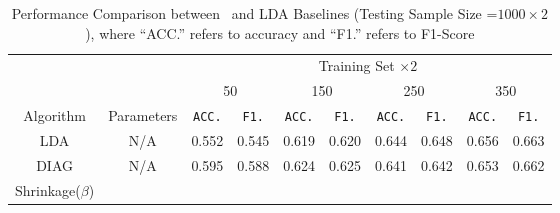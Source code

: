 \begin{table*}
{
\begin{center}
\caption{Performance Comparison between \TheName\ and LDA Baselines  (Testing Sample Size =$1000\times 2$), where ``ACC.'' refers to accuracy and ``F1.'' refers to F1-Score}
		\label{tab:table12}
\begin{tabular}{*{10}{c}}
\toprule
    & & \multicolumn{8}{c}{Training Set $\times 2$}\\
    \cmidrule(lr){3-10}
    & & 
    \multicolumn{2}{c}{50} &
    \multicolumn{2}{c}{150} &
    \multicolumn{2}{c}{250} &
    \multicolumn{2}{c}{350} \\
\cmidrule(lr){3-4}
\cmidrule(lr){5-6}
\cmidrule(lr){7-8}
\cmidrule(lr){9-10}
Algorithm & Parameters & \texttt{ACC.} & \texttt{F1.} &
						\texttt{ACC.} & \texttt{F1.} &
                           \texttt{ACC.} & \texttt{F1.}  &
                           \texttt{ACC.} & \texttt{F1.}  \\
 \cmidrule(lr){1-2}                        
\cmidrule(lr){3-4}
\cmidrule(lr){5-6}
\cmidrule(lr){7-8}
\cmidrule(lr){9-10}
    LDA & N/A &   0.552 & 0.545  &     0.619 & 0.620      & 0.644 & 0.648      & 0.656 & 0.663  \\
 
     \cmidrule(lr){1-2}                        
\cmidrule(lr){3-4}
\cmidrule(lr){5-6}
\cmidrule(lr){7-8}
\cmidrule(lr){9-10}
    DIAG & N/A &   0.595 & 0.588  &     0.624 & 0.625      & 0.641 & 0.642     & 0.653 & 0.662  \\
    \cmidrule(lr){1-2}                        
\cmidrule(lr){3-4}
\cmidrule(lr){5-6}
\cmidrule(lr){7-8}
\cmidrule(lr){9-10}

    \multirow{3}{*}{Shrinkage($\beta$)} 


\end{tabular}
\end{center}}
\end{table*}
